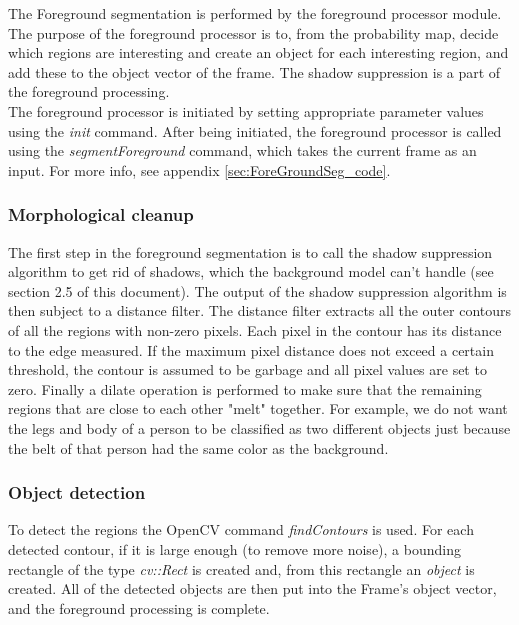 The Foreground segmentation is performed by the foreground processor module. The purpose of the foreground processor is to, from the probability map, decide which regions are interesting and create an object for each interesting region, and add these to the object vector of the frame. The shadow suppression is a part of the foreground processing. \\
\newline
The foreground processor is initiated by setting appropriate parameter values using the \emph{init} command. After being initiated, the foreground processor is called using the \emph{segmentForeground} command, which takes the current frame as an input. For more info, see appendix \ref{sec:ForeGroundSeg_code}.

\subsubsection{Morphological cleanup}
The first step in the foreground segmentation is to call the shadow suppression algorithm to get rid of shadows, which the background model can't handle (see section 2.5 of this document). The output of the shadow suppression algorithm is then subject to a distance filter. The distance filter extracts all the outer contours of all the regions with non-zero pixels. Each pixel in the contour has its distance to the edge measured. If the maximum pixel distance does not exceed a certain threshold, the contour is assumed to be garbage and all pixel values are set to zero. Finally a dilate operation is performed to make sure that the remaining regions that are close to each other "melt" together. For example, we do not want the legs and body of a person to be classified as two different objects just because the belt of that person had the same color as the background. 


\subsubsection{Object detection}
To detect the regions the OpenCV command \emph{findContours} is used. For each detected contour, if it is large enough (to remove more noise), a bounding rectangle of the type \emph{cv::Rect} is created and, from this rectangle an \emph{object} is created. All of the detected objects are then put into the Frame's object vector, and the foreground processing is complete.